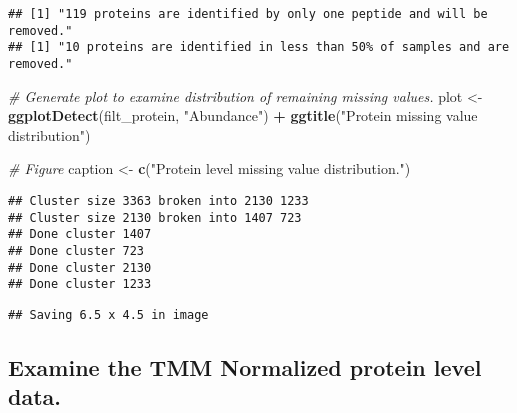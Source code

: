 \documentclass[]{article}
\newenvironment{Shaded}{\begin{snugshade}}{\end{snugshade}}
\newcommand{\KeywordTok}[1]{\textcolor[rgb]{0.13,0.29,0.53}{\textbf{#1}}}
\newcommand{\StringTok}[1]{\textcolor[rgb]{0.31,0.60,0.02}{#1}}
\newcommand{\CommentTok}[1]{\textcolor[rgb]{0.56,0.35,0.01}{\textit{#1}}}
\newcommand{\OperatorTok}[1]{\textcolor[rgb]{0.81,0.36,0.00}{\textbf{#1}}}
\newcommand{\NormalTok}[1]{#1}
\begin{document}
\begin{verbatim}
## [1] "119 proteins are identified by only one peptide and will be removed."
## [1] "10 proteins are identified in less than 50% of samples and are removed."
\end{verbatim}

\begin{Shaded}
\begin{Highlighting}[]
\CommentTok{# Generate plot to examine distribution of remaining missing values.}
\NormalTok{plot <-}\StringTok{ }\KeywordTok{ggplotDetect}\NormalTok{(filt_protein, }\StringTok{"Abundance"}\NormalTok{) }\OperatorTok{+}
\StringTok{  }\KeywordTok{ggtitle}\NormalTok{(}\StringTok{"Protein missing value distribution"}\NormalTok{)}

\CommentTok{# Figure}
\NormalTok{caption <-}\StringTok{ }\KeywordTok{c}\NormalTok{(}\StringTok{"Protein level missing value distribution."}\NormalTok{)}
\end{Highlighting}
\end{Shaded}

\begin{verbatim}
## Cluster size 3363 broken into 2130 1233 
## Cluster size 2130 broken into 1407 723 
## Done cluster 1407 
## Done cluster 723 
## Done cluster 2130 
## Done cluster 1233
\end{verbatim}

\begin{verbatim}
## Saving 6.5 x 4.5 in image
\end{verbatim}

\subsection{Examine the TMM Normalized protein level
data.}\label{examine-the-tmm-normalized-protein-level-data.}
\end{document}
